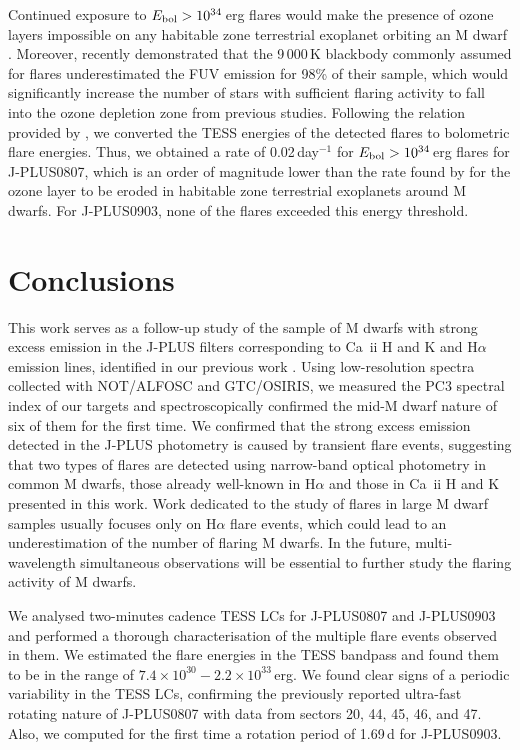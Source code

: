 Continued exposure to $E_{\rm bol}>10^{34}$\,erg flares would make the presence of ozone layers impossible on any habitable zone terrestrial exoplanet orbiting an M dwarf \citep{tilley2019,chen2021}. Moreover, \citet{berger2024} recently demonstrated that the 9\,000\,K blackbody commonly assumed for flares underestimated the FUV emission for 98\% of their sample, which would significantly increase the number of stars with sufficient flaring activity to fall into the ozone depletion zone from previous studies. Following the relation provided by \citet{seli2021}, we converted the TESS energies of the detected flares to bolometric flare energies. Thus, we obtained a rate of 0.02\,day$^{-1}$ for $E_{\rm bol}>10^{34}$\,erg flares for J-PLUS0807, which is an order of magnitude lower than the rate found by \citet{tilley2019} for the ozone layer to be eroded in habitable zone terrestrial exoplanets around M dwarfs. For J-PLUS0903, none of the flares exceeded this energy threshold.




\section{Conclusions} \label{sec:conclusions}

This work serves as a follow-up study of the sample of M dwarfs with strong excess emission in the J-PLUS filters corresponding to Ca~{\sc ii} H and K and H$\alpha$ emission lines, identified in our previous work \citep{masbuitrago2022}. Using low-resolution spectra collected with NOT/ALFOSC and GTC/OSIRIS, we measured the PC3 spectral index of our targets and spectroscopically confirmed the mid-M dwarf nature of six of them for the first time. We confirmed that the strong excess emission detected in the J-PLUS photometry is caused by transient flare events, suggesting that two types of flares are detected using narrow-band optical photometry in common M dwarfs, those already well-known in H$\alpha$ and those in Ca~{\sc ii} H and K presented in this work. Work dedicated to the study of flares in large M dwarf samples usually focuses only on H$\alpha$ flare events, which could lead to an underestimation of the number of flaring M dwarfs. In the future, multi-wavelength simultaneous observations will be essential to further study the flaring activity of M dwarfs.

We analysed two-minutes cadence TESS LCs for J-PLUS0807 and J-PLUS0903 and performed a thorough characterisation of the multiple flare events observed in them. We estimated the flare energies in the TESS bandpass and found them to be in the range of $7.4\times10^{30}-2.2\times10^{33}$\,erg. We found clear signs of a periodic variability in the TESS LCs, confirming the previously reported ultra-fast rotating nature of J-PLUS0807 with data from sectors 20, 44, 45, 46, and 47. Also, we computed for the first time a rotation period of 1.69\,d for J-PLUS0903.

